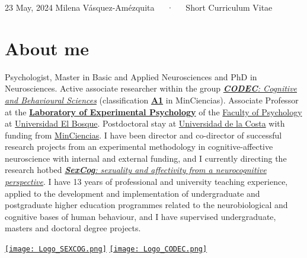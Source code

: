 \documentclass[11pt,a4paper,]{awesome-cv}
\begin{document}
\makecvheader

\makecvfooter
  {23 May, 2024}
    {Milena Vásquez-Amézquita~~~·~~~Short Curriculum Vitae}
  {\thepage}





\hypertarget{about-me}{%
\section{About me}\label{about-me}}

\begin{minipage}[c]{0.85\linewidth}
Psychologist, Master in Basic and Applied Neurosciences and PhD in Neurosciences. Active associate researcher within the group \href{https://investigaciones.unbosque.edu.co/codec}{\textit{\textbf{CODEC}: Cognitive and Behavioural Sciences}} (classification \href{https://scienti.minciencias.gov.co/gruplac/jsp/visualiza/visualizagr.jsp?nro=00000000001446}{\textbf{A1}} in MinCiencias). Associate Professor at the \href{https://grupo-codec.netlify.app/labpsiexp/}{\textbf{Laboratory of Experimental Psychology}} of the \href{https://www.uelbosque.edu.co/psicologia}{Faculty of Psychology} at \href{https://www.uelbosque.edu.co/}{Universidad El Bosque}. Postdoctoral stay at \href{https://www.cuc.edu.co/}{Universidad de la Costa} with funding from \href{https://minciencias.gov.co/}{MinCiencias}. I have been director and co-director of successful research projects from an experimental methodology in cognitive-affective neuroscience with internal and external funding, and I currently directing the research hotbed \href{https://grupo-codec.netlify.app/sexcog/}{\textit{\textbf{SexCog}: sexuality and affectivity from a neurocognitive perspective}}. I have 13 years of professional and university teaching experience, applied to the development and implementation of undergraduate and postgraduate higher education programmes related to the neurobiological and cognitive bases of human behaviour, and I have supervised undergraduate, masters and doctoral degree projects.
\end{minipage} \begin{minipage}[c]{0.15\linewidth}
\begin{flushright} 
\hfill \href{https://grupo-codec.netlify.app/sexcog/}{\texttt{[image: Logo\_SEXCOG.png]}} \newline \href{https://investigaciones.unbosque.edu.co/codec}{\texttt{[image: Logo\_CODEC.png]}}
\end{flushright}
\end{minipage}
\end{document}
